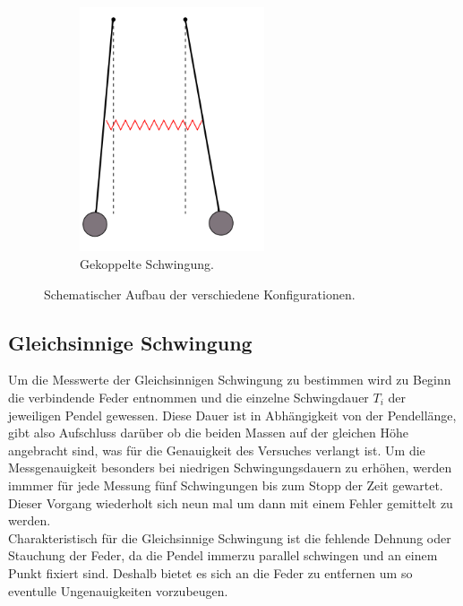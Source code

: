 \begin{figure}
    \hfill
    \begin{subfigure}[b]{0.3\textwidth}
        \centering
        \includegraphics[width=0.6\textwidth]{bilder/koppel.png}
        \caption{Gekoppelte Schwingung.}
        \label{fig:6}
    \end{subfigure}
    \caption{Schematischer Aufbau der verschiedene Konfigurationen. \cite{skript}}
\end{figure}

\subsection{Gleichsinnige Schwingung}
Um die Messwerte der Gleichsinnigen Schwingung zu bestimmen wird zu Beginn die verbindende Feder entnommen und 
die einzelne Schwingdauer $T_i$ der jeweiligen Pendel gewessen. Diese Dauer ist in Abhängigkeit von der Pendellänge, gibt also 
Aufschluss darüber ob die beiden Massen auf der gleichen Höhe angebracht sind, was für die Genauigkeit des Versuches verlangt ist.
Um die Messgenauigkeit besonders bei niedrigen Schwingungsdauern zu erhöhen, werden immmer für jede Messung fünf Schwingungen 
bis zum Stopp der Zeit gewartet. Dieser Vorgang wiederholt sich neun mal um dann mit einem Fehler gemittelt zu werden. 
\\
\newline
Charakteristisch für die Gleichsinnige Schwingung ist die fehlende Dehnung oder Stauchung der Feder, da die Pendel immerzu 
parallel schwingen und an einem Punkt fixiert sind. Deshalb bietet es sich an die Feder zu entfernen um so eventulle Ungenauigkeiten 
vorzubeugen.

